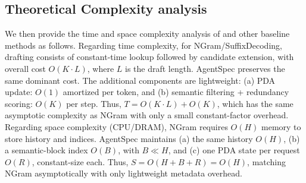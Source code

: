 \subsection{Theoretical Complexity analysis} We then provide the time and space complexity analysis of \sysname and other baseline methods as follows. Regarding time complexity, for NGram/SuffixDecoding, drafting consists of constant-time lookup followed by candidate extension, with overall cost $O(K \cdot L)$, where $L$ is the draft length. AgentSpec preserves the same dominant cost. The additional components are lightweight: (a) PDA update: $O(1)$ amortized per token, and (b) semantic filtering + redundancy scoring: $O(K)$ per step. Thus, $T = O(K \cdot L) + O(K)$, which has the same asymptotic complexity as NGram with only a small constant-factor overhead. Regarding space complexity (CPU/DRAM), NGram requires $O(H)$ memory to store history and indices. AgentSpec maintains (a) the same history $O(H)$, (b) a semantic-block index $O(B)$, with $B \ll H$, and (c) one PDA state per request $O(R)$, constant-size each. Thus, $S = O(H + B + R) = O(H)$, matching NGram asymptotically with only lightweight metadata overhead.